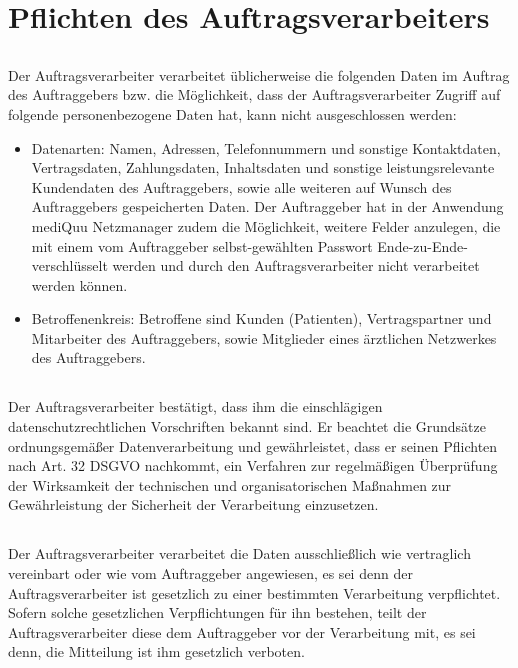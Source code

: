 \documentclass[10pt]{article}
\begin{document}
\section{Pflichten des Auftragsverarbeiters}
\subsection{} Der Auftragsverarbeiter verarbeitet üblicherweise die folgenden Daten im Auftrag
des Auftraggebers bzw. die Möglichkeit, dass der Auftragsverarbeiter Zugriff auf
folgende personenbezogene Daten hat, kann nicht ausgeschlossen werden:
\begin{itemize}
	\item Datenarten: Namen, Adressen, Telefonnummern und sonstige Kontaktdaten,
	      Vertragsdaten, Zahlungsdaten, Inhaltsdaten und sonstige leistungsrelevante
	      Kundendaten des Auftraggebers, sowie alle weiteren auf Wunsch des
	      Auftraggebers gespeicherten Daten. Der Auftraggeber hat in der Anwendung
	      mediQuu Netzmanager zudem die Möglichkeit, weitere Felder anzulegen, die mit
	      einem vom Auftraggeber selbst-gewählten Passwort Ende-zu-Ende-verschlüsselt
	      werden und durch den Auftragsverarbeiter nicht verarbeitet werden können.
	\item Betroffenenkreis: Betroffene sind Kunden (Patienten), Vertragspartner und
	      Mitarbeiter des Auftraggebers, sowie Mitglieder eines ärztlichen Netzwerkes des
	      Auftraggebers.
\end{itemize}
\subsection{} Der Auftragsverarbeiter bestätigt, dass ihm die einschlägigen datenschutzrechtlichen
Vorschriften bekannt sind. Er beachtet die Grundsätze ordnungsgemäßer
Datenverarbeitung und gewährleistet, dass er seinen Pflichten nach Art. 32 DSGVO
nachkommt, ein Verfahren zur regelmäßigen Überprüfung der Wirksamkeit der
technischen und organisatorischen Maßnahmen zur Gewährleistung der Sicherheit
der Verarbeitung einzusetzen.
\subsection{} Der Auftragsverarbeiter verarbeitet die Daten ausschließlich wie vertraglich
vereinbart oder wie vom Auftraggeber angewiesen, es sei denn der
Auftragsverarbeiter ist gesetzlich zu einer bestimmten Verarbeitung verpflichtet.
Sofern solche gesetzlichen Verpflichtungen für ihn bestehen, teilt der
Auftragsverarbeiter diese dem Auftraggeber vor der Verarbeitung mit, es sei denn,
die Mitteilung ist ihm gesetzlich verboten.
\end{document}
